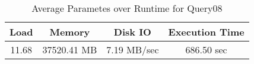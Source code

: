 \documentclass[../../main.tex]{subfiles}
\begin{document}
    \begin{table}
        \begin{center}
            \begin{tabular}{ |c|c|c|c| } 
            \hline
            Load & Memory & Disk IO & Execution Time\\
            \hline
            11.68 & 37520.41 MB & 7.19 MB/sec & 686.50 sec \\
            \hline
            \end{tabular}
            \\[1pt]
            \caption{Average Parametes over Runtime for Query08}
        \end{center}
    \end{table}
    \pagebreak
\end{document}
